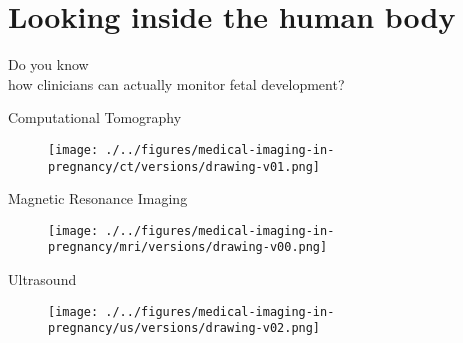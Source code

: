 \section{Looking inside the human body}

{
\begin{frame}{}

\BigSizeFont
\begin{center}
    Do you know \\
    how clinicians can actually monitor fetal development?
\end{center}


\end{frame}
}


{
\begin{frame}{Computational Tomography}
      \begin{figure}
        \centering
        \texttt{[image: ./../figures/medical-imaging-in-pregnancy/ct/versions/drawing-v01.png]}
      \end{figure}
\end{frame}
}


{
\begin{frame}{Magnetic Resonance Imaging}
      \begin{figure}
        \centering
        \texttt{[image: ./../figures/medical-imaging-in-pregnancy/mri/versions/drawing-v00.png]}
      \end{figure}
\end{frame}
}


{
\begin{frame}{Ultrasound}
      \begin{figure}
        \centering
        \texttt{[image: ./../figures/medical-imaging-in-pregnancy/us/versions/drawing-v02.png]}
      \end{figure}
\end{frame}
}

